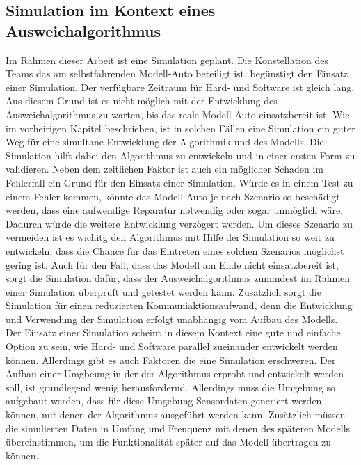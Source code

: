 \subsection{Simulation im Kontext eines Ausweichalgorithmus}
Im Rahmen dieser Arbeit ist eine Simulation geplant. Die Konstellation des Teams das am selbstfahrenden Modell-Auto beteiligt ist, 
begünstigt den Einsatz einer Simulation. Der verfügbare Zeitraum für Hard- und Software ist gleich lang. 
Aus diesem Grund ist es nicht möglich mit der Entwicklung des Ausweichalgorithmus zu warten, bis das reale Modell-Auto einsatzbereit ist. 
Wie im vorheirigen Kapitel beschrieben, ist in solchen Fällen eine Simulation ein guter Weg für eine simultane Entwicklung der Algorithmik und des Modells.
Die Simulation hilft dabei den Algorithmus zu entwickeln und in einer ersten Form zu validieren.
Neben dem zeitlichen Faktor ist auch ein möglicher Schaden im Fehlerfall ein Grund für den Einsatz einer Simulation. Würde es in einem Test zu einem Fehler kommen, könnte das Modell-Auto je nach Szenario 
so beschädigt werden, dass eine aufwendige Reparatur notwendig oder sogar unmöglich wäre. Dadurch würde die weitere Entwicklung verzögert werden. 
Um dieses Szenario zu vermeiden ist es wichitg den Algorithmus mit Hilfe der Simulation so weit zu entwickeln, dass die Chance für das Eintreten eines solchen Szenarios möglichst gering ist.
Auch für den Fall, dass das Modell am Ende nicht einsatzbereit ist, sorgt die Simulation dafür, dass der Ausweichalgorithmus zumindest im Rahmen einer Simulation überprüft und getestet werden kann. 
Zusätzlich sorgt die Simulation für einen reduzierten Kommuniaktionsaufwand, denn die Entwicklung und Verwendung der Simulation erfolgt unabhängig vom Aufbau des Modells.\\
Der Einsatz einer Simulation scheint in diesem Kontext eine gute und einfache Option zu sein, wie Hard- und Software parallel zueinander entwickelt werden können. Allerdings gibt es auch Faktoren die eine Simulation erschweren. 
Der Aufbau einer Umgbeung in der der Algorithmus erprobt und entwickelt werden soll, ist grundlegend wenig herausfordernd. Allerdings muss die Umgebung so aufgebaut werden, dass für diese Umgebung Sensordaten generiert werden können,
mit denen der Algorithmus ausgeführt werden kann. Zusätzlich müssen die simulierten Daten in Umfang und Freuquenz mit denen des späteren Modells übereinstimmen, um die Funktionalität später auf das Modell übertragen zu können. \\

